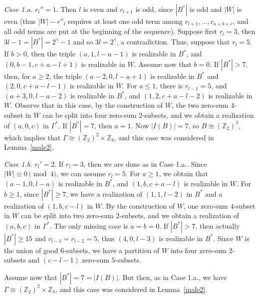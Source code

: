 \documentclass[final]{dmtcs-episciences}
\newcommand{\zet}{\mathbb{Z}}
\begin{document}
 \textit{Case 1.a.}  $r_l''=1$.
Then $l$ is even and $r_{l+1}$ is odd, since $|B^{*}|$ is odd and $|W|$ is even
 (thus $|W|-r''_l$ requires at least one odd term among $r_{l+1},\dots,r_{a+b+c}$,
 and all odd terms are put at the beginning of the sequence).
{Suppose first $r_l=3$, then $3l-1=|B^{*}|=2^{\gamma}-1$ and so
$3l=2^{\gamma}$, a contradiction. Thus, suppose} that $r_l=5$. If $b>0$, then the triple $(a,1,l-a-1)$ is realizable in $B^*$, and $(0,b-1,c+a-l+1)$ is realizable in $W$. Assume now that $b=0$. If $|B^{*}|>7$, then, for $a\geq 2$, the triple $(a-2,0,l-a+1)$ is realizable in $B^*$ and $(2,0,c+a-l-1)$ is realizable in $W$. For $a\leq1$, there is  $r_{l-1}=5$, and $(a+3,0,l-a-2)$ is realizable in $B^*$, and $(1,2,c+a-l-2)$ is realizable in $W$.
Observe that in this case, by the construction of $W$, the two zero-sum $4$-subset in $W$ can be split into four zero-sum $2$-subsets, and we obtain a realization of $(a,0,c)$ in $\Gamma^*$. If $|B^{*}|=7$, then $a=1$. Now  $|I(B)|=7$, so $B\cong(\zet_2)^3$, which implies that $\Gamma \cong (\zet_2)^2\times\zet_8$, and this case was considered in Lemma~\ref{male2}. 

 \textit{Case 1.b.}  $r_l'=2$.
If $r_l=3$, then we are done as in Case 1.a.. Since $|W|\equiv 0\pmod 4$, we can assume $r_l=5$. For $a\geq1$, we obtain that {$(a-1,0,l-a)$ is realizable in $B^*$, and $(1,b,c+a-l)$ is realizable in $W$. For $b\geq 1$, since $|B^{*}|\geq 7$},  we have a realization of $(1,1,l-2)$ in $B^*$ and a realization of $(1,b,c-l)$ in $W$. By the construction of $W$, one zero-sum $4$-subset in $W$ can be split into two zero-sum $2$-subsets, and we obtain a realization of $(a,b,c)$ in $\Gamma^*$.
The only missing case is $a=b=0$. If $|B^{*}|>7$, then actually $|B^{*}|\geq 15$ and $r_{l-1}=r_{l-2}=5$, thus $(4,0,l-3)$ is realizable in $B^*$. Since $W$ is the union of good 6-subsets, we have a partition of $W$ into four zero-sum $2$-subsets and $(c-l-1)$ zero-sum $5$-subsets.

Assume now that $|B^{*}|=7= |I(B)|$. But then, as in Case 1.a., we have $\Gamma \cong (\zet_2)^2\times\zet_8$, and this case was considered in Lemma~\ref{male2}.
\end{document}
